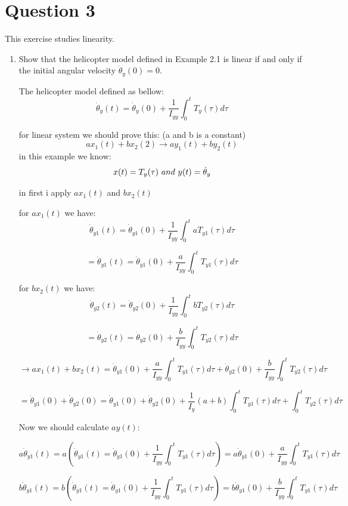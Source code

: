 \documentclass[12pt]{article}
\begin{document}
\section{Question 3}
This exercise studies linearity.

\begin{enumerate}
	\item Show that the helicopter model defined in Example 2.1 is linear if and only if
	the initial angular velocity $\dot{\theta}_{y}(0) = 0.$
	
	\begin{qsolve}[Solution]
		The helicopter model defined as bellow:
		$$\dot{\theta}_{y}(t) = \dot{\theta}_{y}(0) + \frac{1}{I_{yy}} \int_{0}^{t}T_y(\tau)d\tau$$
		
		for linear system we should prove this: (a and b is a constant)
		$$ ax_1(t)+bx_2(2) \rightarrow ay_1(t)+by_2(t) $$
		in this example we know:
		$$ x(t) = T_y(\tau) \\\ and \\\ y(t) = \dot{\theta}_{y}$$  
		
		in first i apply $ax_1(t)$ and $bx_2(t)$
		
		for $ax_1(t)$ we have:
		$$\dot{\theta}_{y1}(t) = \dot{\theta}_{y1}(0) + \frac{1}{I_{yy}} \int_{0}^{t}aT_{y1}(\tau)d\tau$$
		
		$$=\dot{\theta}_{y1}(t) = \dot{\theta}_{y1}(0) + \frac{a}{I_{yy}} \int_{0}^{t}T_{y1}(\tau)d\tau$$
		
		
		for $bx_2(t)$ we have:
		$$\dot{\theta}_{y2}(t) = \dot{\theta}_{y2}(0) + \frac{1}{I_{yy}} \int_{0}^{t}bT_{y2}(\tau)d\tau$$
		
		$$=\dot{\theta}_{y2}(t) = \dot{\theta}_{y2}(0) + \frac{b}{I_{yy}} \int_{0}^{t}T_{y2}(\tau)d\tau$$
		
		
		$$\rightarrow ax_1(t) + bx_2(t) = \dot{\theta}_{y1}(0) + \frac{a}{I_{yy}} \int_{0}^{t}T_{y1}(\tau)d\tau + \dot{\theta}_{y2}(0) + \frac{b}{I_{yy}} \int_{0}^{t}T_{y2}(\tau)d\tau$$
		
		$$ =\dot{\theta}_{y1}(0)+\dot{\theta}_{y2}(0)=\dot{\theta}_{y1}(0)+\dot{\theta}_{y2}(0)+\frac{1}{I_{y}}(a+b) \int_{0}^{t}T_{y1}(\tau)d\tau + \int_{0}^{t}T_{y2}(\tau)d\tau $$
		
		
		Now we should calculate $ay(t):$
		
		$$ a\dot{\theta}_{y1}(t) = a(\dot{\theta}_{y1}(t) = \dot{\theta}_{y1}(0) + \frac{1}{I_{yy}} \int_{0}^{t}T_{y1}(\tau)d\tau) = a\dot{\theta}_{y1}(0) + \frac{a}{I_{yy}}\int_{0}^{t}T_{y1}(\tau)d\tau $$
		
		
		$$ b\dot{\theta}_{y1}(t) = b(\dot{\theta}_{y1}(t) = \dot{\theta}_{y1}(0) + \frac{1}{I_{yy}} \int_{0}^{t}T_{y1}(\tau)d\tau) = b\dot{\theta}_{y1}(0) + \frac{b}{I_{yy}}\int_{0}^{t}T_{y1}(\tau)d\tau $$


\end{qsolve}
\end{enumerate}
\end{document}
